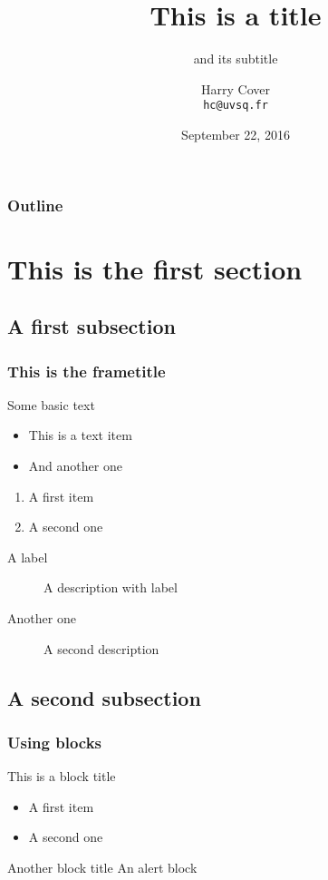\documentclass[10pt,hidelinks]{beamer}
\title[Short Title]{This is a title}
\subtitle{and its subtitle}
\author[H. Cover]{
  Harry Cover\\
  \texttt{hc@uvsq.fr}
}
\institute[UVSQ]{
  Universit\'e de Versailles Saint-Quentin
  }
\date[September 2016]{September 22, 2016}
\begin{document}
\begin{frame}[plain]
  \titlepage
\end{frame}


\begin{frame}
  \frametitle{Outline}
  \tableofcontents
\end{frame}
\section{This is the first section}

\subsection{A first subsection}

\begin{frame}
  \frametitle{This is the frametitle}
  Some basic text

  \vfill

  \begin{itemize}
  \item This is a text item
  \item And another one
  \end{itemize}

  \vfill

  \begin{enumerate}
  \item A first item
  \item A second one
  \end{enumerate}

  \vfill

  \begin{description}
  \item[A label] A description with label
  \item[Another one] A second description
  \end{description}
\end{frame}

\subsection{A second subsection}

\begin{frame}
  \frametitle{Using blocks}

  \begin{block}{This is a block title}
    \begin{itemize}
    \item A first item
    \item A second one
    \end{itemize}
  \end{block}
  \vfill
  \begin{alertblock}{Another block title}
    An alert block
  \end{alertblock}
\end{frame}
\end{document}
